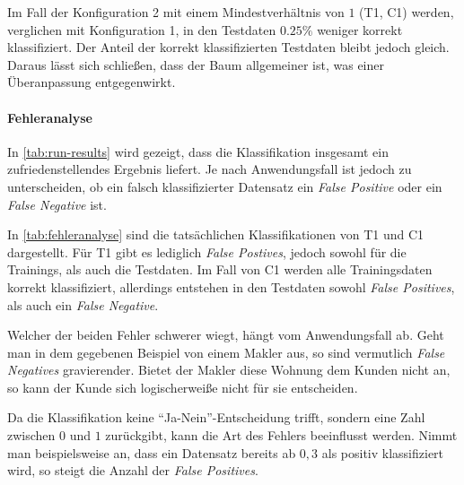 Im Fall der Konfiguration 2 mit einem Mindestverhältnis von $1$ (T1, C1) werden, verglichen mit Konfiguration 1, in den Testdaten $0.25\%$ weniger korrekt klassifiziert.
Der Anteil der korrekt klassifizierten Testdaten bleibt jedoch gleich.
Daraus lässt sich schließen,
dass der Baum allgemeiner ist, was einer Überanpassung entgegenwirkt.

\paragraph{Fehleranalyse}
In \autoref{tab:run-results} wird gezeigt, dass die Klassifikation insgesamt ein zufriedenstellendes Ergebnis liefert.
Je nach Anwendungsfall ist jedoch zu unterscheiden,
ob ein falsch klassifizierter Datensatz ein \emph{False Positive} oder ein \emph{False Negative} ist.

In \autoref{tab:fehleranalyse} sind die tatsächlichen Klassifikationen von T1 und C1 dargestellt.
Für T1 gibt es lediglich \emph{False Postives}, jedoch sowohl für die Trainings,
als auch die Testdaten.
Im Fall von C1 werden alle Trainingsdaten korrekt klassifiziert,
allerdings entstehen in den Testdaten sowohl \emph{False Positives}, als auch ein \emph{False Negative}.

Welcher der beiden Fehler schwerer wiegt, hängt vom Anwendungsfall ab.
Geht man in dem gegebenen Beispiel von einem Makler aus,
so sind vermutlich \emph{False Negatives} gravierender.
Bietet der Makler diese Wohnung dem Kunden nicht an,
so kann der Kunde sich logischerweiße nicht für sie entscheiden.

Da die Klassifikation keine \enquote{Ja-Nein}-Entscheidung trifft,
sondern eine Zahl zwischen $0$ und $1$ zurückgibt,
kann die Art des Fehlers beeinflusst werden.
Nimmt man beispielsweise an,
dass ein Datensatz bereits ab $0,3$ als positiv klassifiziert wird,
so steigt die Anzahl der \emph{False Positives}.

